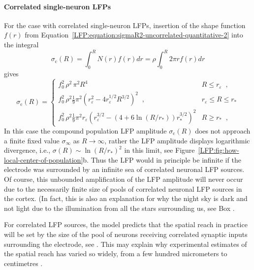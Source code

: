 \paragraph{Correlated single-neuron LFPs}

For the case with correlated single-neuron LFPs, insertion of the shape function $f(r)$ from 
Equation~\ref{LFP:equation:sigmaR2-uncorrelated-quantitative-2}  into the integral
\begin{equation}
\sigma_\text{c}(R)  = \int_0^R N(r)  f(r) dr  = \rho \int_0^R 2 \pi r  f(r) dr 
\label{LFP:equation:sigmaR2-correlated-quantitative}
\end{equation}
gives
\begin{equation}
  \sigma_\text{c}(R) =
  \begin{cases}
    f_0^2 \, \rho^2 \, \pi^2 R^4                   &   R \le r_\varepsilon   \;\;,\\
    f_0^2 \, \rho^2 \frac{1}{9} \pi^2 \left( r_\varepsilon^2 - 4 r_\varepsilon^{1/2} R^{3/2} \right)^2 \;\;, &   r_\varepsilon \le R \le r_* \\
    f_0^2 \, \rho^2 \frac{1}{9} \pi ^2 r_{\varepsilon } \left(r_{\varepsilon }^{3/2}-\left(4+6 \ln\left(R/r_*\right)\right) r_*^{3/2}\right)^2
  & R \ge r_* \;\;,
  \end{cases} 
  \label{LFP:equation:sigmaR2-correlated-quantitative-2}  
\end{equation}
In this case the compound population LFP amplitude $\sigma_\text{c}(R)$ does not approach a finite fixed value $\sigma_\infty$ as $R \rightarrow \infty$, rather the LFP amplitude
displays logarithmic divergence, i.e., $\sigma (R) \sim \ln(R/r_*)^2$ in this limit, see Figure~\ref{LFP:fig:how-local-center-of-population}b.
Thus the LFP would in principle be infinite if the electrode was surrounded by an infinite sea of correlated neuronal LFP sources. Of course, this unbounded amplification of the LFP amplitude will never occur  
due to the necessarily finite size of pools of correlated neuronal LFP sources in the cortex. (In fact, this is also an explanation for 
why the night sky is dark and not light due to the illumination from all the stars surrounding us, see  Box .

For correlated LFP sources, the model predicts that the spatial reach in practice will be set by the size of the pool of neurons receiving correlated synaptic inputs surrounding the electrode, see \citet[Figure~5]{Linden2011}. This may explain why experimental estimates of the spatial reach has varied so widely, from a few hundred micrometers to centimetres .

